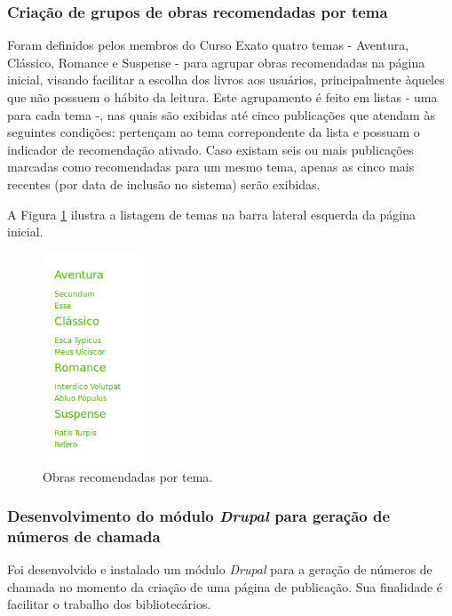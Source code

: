\documentclass[a4paper]{article}
\begin{document}
\subsubsection{Criação de grupos de obras recomendadas por tema}\label{sssec:srecommended}
Foram definidos pelos membros do Curso Exato quatro temas - Aventura, Clássico, Romance e Suspense - para agrupar obras recomendadas na página inicial, visando facilitar a escolha dos livros aos usuários, principalmente àqueles que não possuem o hábito da leitura. Este agrupamento é feito em listas - uma para cada tema -, nas quais são exibidas até cinco publicações que atendam às seguintes condições: pertençam ao tema correpondente da lista e possuam o indicador de recomendação ativado. Caso existam seis ou mais publicações marcadas como recomendadas para um mesmo tema, apenas as cinco mais recentes (por data de inclusão no sistema) serão exibidas.

A Figura \ref{recommended} ilustra a listagem de temas na barra lateral esquerda da página inicial.

\begin{figure}[pbth!]
\centering
\caption{Obras recomendadas por tema.\label{recommended}}
\includegraphics[width=30mm]{img/leftsidebar-close.png}
\end{figure}

\subsubsection{Desenvolvimento do módulo \textit{Drupal} para geração de números de chamada}\label{sssec:chamada}

Foi desenvolvido e instalado um módulo \textit{Drupal} para a geração de números de chamada no momento da criação de uma página de publicação. Sua finalidade é facilitar o trabalho dos bibliotecários.
\end{document}
